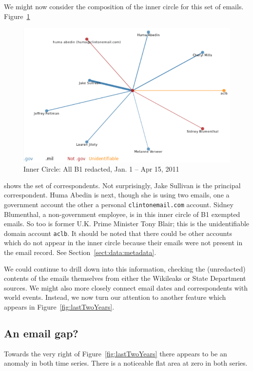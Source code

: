 \documentclass[journal]{vgtc}                %
\begin{document}
We might now consider the composition of the inner circle for this set of emails.  Figure~\ref{fig:InnerCircle2011B1LibyaBuildup} 
\begin{figure}[h]
\begin{center}
\includegraphics[width=0.95\linewidth]{InnerCircle2011B1LibyaBuildup}
\caption{Inner Circle: All  B1 redacted, Jan. 1 -- Apr 15, 2011}
\label{fig:InnerCircle2011B1LibyaBuildup}
\end{center}
\end{figure}
shows the set of correspondents.  Not surprisingly, Jake Sullivan is the principal correspondent.  Huma Abedin is next, though she is using two emails, one a government account the other a personal \texttt{clintonemail.com} account.   Sidney Blumenthal, a non-government employee, is in this inner circle of B1 exempted emails.  So too is former U.K. Prime Minister Tony Blair; this is the unidentifiable domain account \texttt{aclb}.
It should be noted that there could be other accounts which do not appear in the inner circle because their emails were not present in the email record.  See Section~\ref{sect:data:metadata}.

We could continue to drill down into this information, checking the (unredacted) contents of the emails themselves from either the Wikileaks or State Department sources.  We might also more closely connect email dates and correspondents with world events.   Instead, we now turn our attention to another feature which appears in Figure~\ref{fig:lastTwoYears}.

\subsection{An email gap?}
\label{sect:emailGap}
Towards the very right of Figure~\ref{fig:lastTwoYears} there appears to be an anomaly in both time series.  There is a noticeable flat area at zero in both series.  
\end{document}
